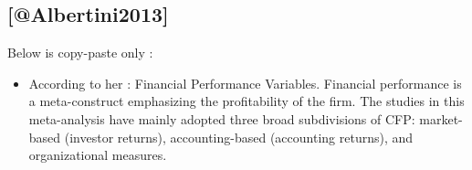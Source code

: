 \documentclass[]{article}
\providecommand{\tightlist}{%
  \setlength{\itemsep}{0pt}\setlength{\parskip}{0pt}}
\begin{document}
\subsection{{[}@Albertini2013{]}}\label{albertini2013}

Below is copy-paste only :

\begin{itemize}
\tightlist
\item
  According to her : Financial Performance Variables. Financial
  performance is a meta-construct emphasizing the profitability of the
  firm. The studies in this meta-analysis have mainly adopted three
  broad subdivisions of CFP: market-based (investor returns),
  accounting-based (accounting returns), and organizational measures.
\end{itemize}
\end{document}
